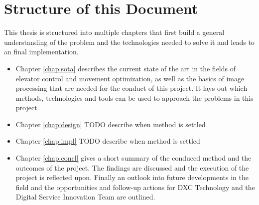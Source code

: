 \section{Structure of this Document}

This thesis is structured into multiple chapters that first build a general understanding of the problem and the technologies needed to solve it and leads to an final implementation.

\begin{itemize}
    \item Chapter \ref{chap:sota} describes the current state of the art in the fields of elevator control and movement optimization, as well as the basics of image processing that are needed for the conduct of this project. It lays out which methods, technologies and tools can be used to approach the problems in this project.
    \item Chapter \ref{chap:design} TODO describe when method is settled
    \item Chapter \ref{chap:impl} TODO describe when method is settled
    \item Chapter \ref{chap:concl} gives a short summary of the conduced method and the outcomes of the project. The findings are discussed and the execution of the project is reflected upon. Finally an outlook into future developments in the field and the opportunities and follow-up actions for DXC Technology and the Digital Service Innovation Team are outlined.
\end{itemize}